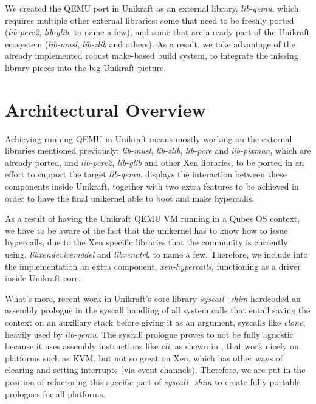 We created the QEMU port in Unikraft as an external library, \textit{lib-qemu}, which requires multiple other external libraries: some that need to be freshly ported (\textit{lib-pcre2}, \textit{lib-glib}, to name a few), and some that are already part of the Unikraft ecosystem (\textit{lib-musl}, \textit{lib-zlib} and others).
As a result, we take advantage of the already implemented robust make-based build system, to integrate the missing library pieces into the big Unikraft picture.

\section{Architectural Overview}
\label{sec:arch-overview}

Achieving running QEMU in Unikraft means mostly working on the external libraries mentioned previously: \textit{lib-musl}, \textit{lib-zlib}, \textit{lib-pcre} and \textit{lib-pixman}, which are already ported, and \textit{lib-pcre2}, \textit{lib-glib} and other Xen libraries, to be ported in an effort to support the target \textit{lib-qemu}.
 displays the interaction between these components inside Unikraft, together with two extra features to be achieved in order to have the final unikernel able to boot and make hypercalls.


As a result of having the Unikraft QEMU VM running in a Qubes OS context, we have to be aware of the fact that the unikernel has to know how to issue hypercalls, due to the Xen specific libraries that the community is currently using, \textit{libxendevicemodel} and \textit{libxenctrl}, to name a few.
Therefore, we include into the implementation an extra component, \textit{xen-hypercalls}, functioning as a driver inside Unikraft core.

What's more, recent work in Unikraft's core library \textit{syscall_shim} hardcoded an assembly prologue in the syscall handling of all system calls that entail saving the context on an auxiliary stack before giving it as an argument, syscalls like \textit{clone}, heavily used by \textit{lib-qemu}.
The syscall prologue proves to not be fully agnostic because it uses assembly instructions like \textit{cli}, as shown in , that work nicely on platforms such as KVM, but not so great on Xen, which has other ways of clearing and setting interrupts (via event channels).
Therefore, we are put in the position of refactoring this specific part of \textit{syscall_shim} to create fully portable prologues for all platforms.

